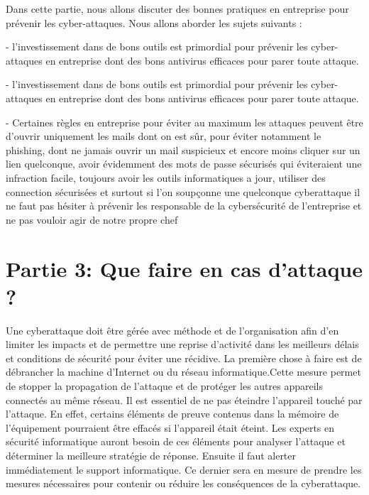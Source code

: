 \documentclass[a4paper,11pt]{article}
\begin{document}
Dans cette partie, nous allons discuter des bonnes pratiques en entreprise pour prévenir les cyber-attaques. Nous allons aborder les sujets suivants :

  - l’investissement dans de bons outils est primordial pour prévenir les cyber-attaques en entreprise dont des bons antivirus efficaces pour parer toute attaque.

  - l’investissement dans de bons outils est primordial pour prévenir les cyber-attaques en entreprise dont des bons antivirus efficaces pour parer toute attaque.

  - Certaines règles en entreprise pour éviter au maximum les attaques peuvent être d’ouvrir uniquement les mails dont on est sûr, pour éviter notamment le phishing, dont ne jamais ouvrir un mail suspicieux et encore moins cliquer sur un lien quelconque, avoir évidemment des mots de passe sécurisés qui éviteraient une infraction facile, toujours avoir les outils informatiques a jour, utiliser des connection sécurisées et surtout si l’on soupçonne une quelconque cyberattaque il ne faut pas hésiter à prévenir les responsable de la cybersécurité de l’entreprise et ne pas vouloir agir de notre propre chef


\section{Partie 3: Que faire en cas d’attaque ?}

Une cyberattaque doit être gérée avec méthode et de l’organisation afin d’en limiter les impacts et de permettre une reprise d’activité dans les meilleurs délais et conditions de sécurité pour éviter une récidive.
La première chose à faire est de débrancher la machine d’Internet ou du réseau informatique.Cette mesure permet de stopper la propagation de l’attaque et de protéger les autres appareils connectés au même réseau.
Il est essentiel de ne pas éteindre l’appareil touché par l’attaque. En effet, certains éléments de preuve contenus dans la mémoire de l’équipement pourraient être effacés si l’appareil était éteint. Les experts en sécurité informatique auront besoin de ces éléments pour analyser l’attaque et déterminer la meilleure stratégie de réponse.
Ensuite il faut alerter immédiatement le support informatique. Ce dernier sera en mesure de prendre les mesures nécessaires pour contenir ou réduire les conséquences de la cyberattaque.
\end{document}

